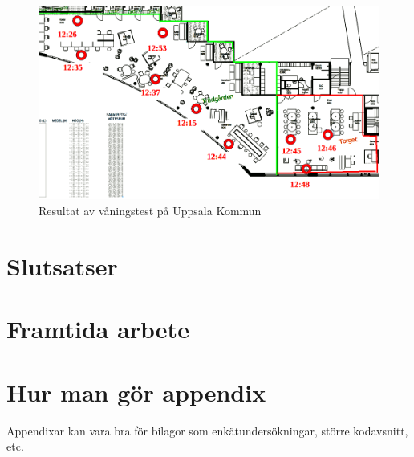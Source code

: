 \documentclass[swedish, a4paper,12pt]{article}
\begin{document}
\begin{figure}[H]
  \centering
  \includegraphics[width=15cm]{media/vaningstest_uppsala_kommun_2.png}
  \caption{Resultat av våningstest på Uppsala Kommun}
  \label{fig:vanings_test}
\end{figure}

\section{Slutsatser}

\section{Framtida arbete}

\newpage

%



\newpage
\appendix %
\iffalse \section{Hur man gör appendix}
Appendixar kan vara bra för bilagor som enkätundersökningar, större kodavsnitt, etc.
\end{document}
